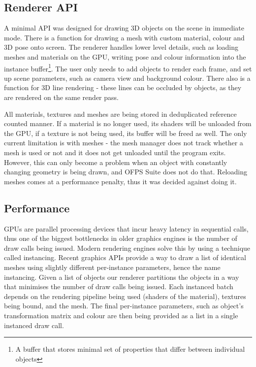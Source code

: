 \documentclass[11pt,english]{report}
\begin{document}
\subsection{Renderer API}

A minimal API was designed for drawing 3D objects on the scene in immediate mode. There is a function for drawing a mesh with custom material, colour and 3D pose onto screen. The renderer handles lower level details, such as loading meshes and materials on the GPU, writing pose and colour information into the instance buffer\footnote{A buffer that stores minimal set of properties that differ between individual objects}. The user only needs to add objects to render each frame, and set up scene parameters, such as camera view and background colour. There also is a function for 3D line rendering - these lines can be occluded by objects, as they are rendered on the same render pass.

All materials, textures and meshes are being stored in deduplicated reference counted manner. If a material is no longer used, its shaders will be unloaded from the GPU, if a texture is not being used, its buffer will be freed as well. The only current limitation is with meshes - the mesh manager does not track whether a mesh is used or not and it does not get unloaded until the program exits. However, this can only become a problem when an object with constantly changing geometry is being drawn, and OFPS Suite does not do that. Reloading meshes comes at a performance penalty, thus it was decided against doing it.

\subsection{Performance}

GPUs are parallel processing devices that incur heavy latency in sequential calls, thus one of the biggest bottlenecks in older graphics engines is the number of draw calls being issued. Modern rendering engines solve this by using a technique called instancing. Recent graphics APIs provide a way to draw a list of identical meshes using slightly different per-instance parameters, hence the name instancing. Given a list of objects our renderer partitions the objects in a way that minimises the number of draw calls being issued. Each instanced batch depends on the rendering pipeline being used (shaders of the material), textures being bound, and the mesh. The final per-instance parameters, such as object's transformation matrix and colour are then being provided as a list in a single instanced draw call.
\end{document}
